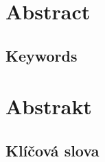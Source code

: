 \openright
\section*{Abstract}
\noindent
\Abstrakt
\subsection*{Keywords}
\noindent
\KlicovaSlova

\bigskip\bigskip\bigskip
\section*{Abstrakt}
\noindent
\AbstraktEN
\subsection*{Klíčová slova}
\noindent
\KlicovaSlovaEN

\openright
